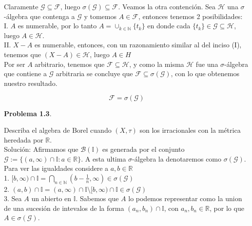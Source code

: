\documentclass[12pt]{article}
\begin{document}
    Claramente $\mathcal{G}\subseteq \mathcal{F}$, luego 
    $\sigma(\mathcal{G})\subseteq \mathcal{F}$. Veamos la otra contenci\'on. Sea $\mathcal{H}$
    una $\sigma$-\'algebra que contenga a $\mathcal{G}$ y tomemos $A\in \mathcal{F}$, entonces
    tenemos 2 posibilidades:
    \\

    I. \hspace*{2pt} $A$ es numerable, por lo tanto $A=\cup_{k\in \mathbb{N}} \{t_k\}$ en donde cada 
    $\{t_k\}\in \mathcal{G}\subseteq \mathcal{H}$, luego $A\in \mathcal{H}$.
    \\

    II. $X-A$ es numerable, entonces, con un razonamiento similar al del inciso (I), tenemos
    \hspace*{30pt} que $(X-A)\in \mathcal{H}$, luego $A\in H$
    \\

    Por ser $A$ arbitrario, tenemos que $\mathcal{F}\subseteq \mathcal{H}$, y como la misma 
    $\mathcal{H}$ fue una $\sigma$-\'algebra que contiene a $\mathcal{G}$ arbitraria se 
    concluye que $\mathcal{F}\subseteq \sigma(\mathcal{G})$, con lo que obtenemos nuestro
    resultado.

    \[\mathcal{F} = \sigma(\mathcal{G})\]
    
    \textbf{Problema 1.3}. 
    
    Describa el algebra de Borel cuando $(X,\tau)$ son los 
    irracionales con la m\'etrica heredada por $\mathbb{R}$.
    \\

    Soluci\'on: Afirmamos que $\mathscr{B}(\mathbb{I})$ es generada por el conjunto 
    $\mathcal{G} := \{(a,\infty)\cap \mathbb{I} : a\in \mathbb{R}\}$. A esta ultima 
    $\sigma$-\'algebra la denotaremos como $\sigma(\mathcal{G})$. Para ver las igualdades
    considere a $a,b\in \mathbb{R}$
    \\
    
    1. $[b,\infty)\cap \mathbb{I} = \bigcap\limits_{n\in \mathbb{N}}(b-\frac{1}{n},\infty)\in \sigma(\mathcal{G})$
    \\

    2. $(a,b)\cap \mathbb{I} = (a,\infty)\cap \mathbb{I} \setminus [b,\infty)\cap \mathbb{I}\in \sigma(\mathcal{G})$
    \\

    3. Sea $A$ un abierto en $\mathbb{I}$. Sabemos que $A$ lo podemos representar como la 
    union de una \hspace*{28pt} sucesi\'on de intevalos de la forma $(a_n,b_n)\cap \mathbb{I}$, con 
    $a_n, b_n\in \mathbb{R}$, por lo que $A\in \sigma(\mathcal{G})$.
    \\
\end{document}
